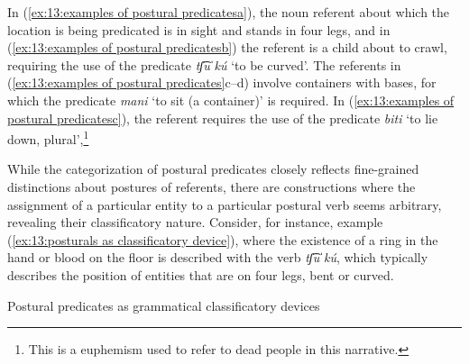                 \label{ex:13:examples of postural predicatese}

    \z %
\z %


In (\ref{ex:13:examples of postural predicatesa}), the noun referent about which the location is being predicated is in sight and stands in four legs, and in (\ref{ex:13:examples of postural predicatesb}) the referent is a child about to crawl, requiring the use of the predicate \textit{tʃ͡uˈkú} `to be curved'. The referents in (\ref{ex:13:examples of postural predicates}c--d) involve containers with bases, for which the predicate \textit{mani} `to sit (a container)' is required. In (\ref{ex:13:examples of postural predicatesc}), the referent requires the use of the predicate \textit{biti} `to lie down, plural',\footnote{This is a euphemism used to refer to dead people in this narrative.}

While the categorization of postural predicates closely reflects fine-grained distinctions about postures of referents, there are constructions where the assignment of a particular entity to a particular postural verb seems arbitrary, revealing their classificatory nature. Consider, for instance, example (\ref{ex:13:posturals as classificatory device}), where the existence of a ring in the hand or blood on the floor is described with the verb \textit{tʃ͡uˈkú}, which typically describes the position of entities that are on four legs, bent or curved.

\ea\label{ex:13:posturals as classificatory device}
{Postural predicates as grammatical classificatory devices}

